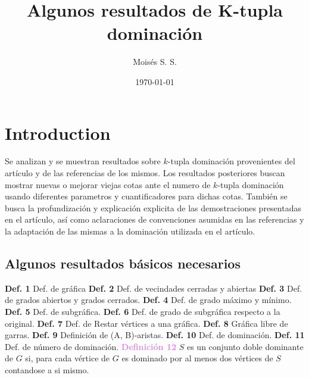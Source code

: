 \documentclass{article}
\title{Algunos resultados de K-tupla dominación}
\author{Moisés S. S.}
\date{\today}
\begin{document}
	\maketitle
	\section*{Introduction}

Se analizan y se muestran resultados sobre $k$-tupla dominación provenientes del artículo \cite{cabrera2022some} y de las referencias de los mismos. Los resultados posteriores buscan mostrar nuevas o mejorar viejas cotas ante el numero de $k$-tupla dominación usando diferentes parametros y cuantificadores para dichas cotas. También se busca la profundización y explicación explicita de las  demostraciones presentadas en el artículo, así como aclaraciones de convenciones asumidas en las referencias y la adaptación de las mismas a la dominación utilizada en el artículo.

	\subsection{Algunos resultados básicos necesarios}

\textbf{Def. 1} Def. de gráfica \newline
\textbf{Def. 2} Def. de vecindades cerradas y abiertas\newline
\textbf{Def. 3} Def. de grados abiertos y grados cerrados.\newline
\textbf{Def. 4} Def. de grado máximo y mínimo.\newline
\textbf{Def. 5} Def. de subgráfica.\newline
\textbf{Def. 6} Def. de grado de subgráfica respecto a la original.\newline
\textbf{Def. 7} Def. de Restar vértices a una gráfica.\newline
\textbf{Def. 8} Gráfica libre de garras.\newline
\textbf{Def. 9} Definición de (A, B)-aristas.\newline
\textbf{Def. 10} Def. de dominación.\newline
\textbf{Def. 11} Def. de número de dominación.\newline
\textcolor{Violet}{\textbf{Definición 12}} $S$ es un conjunto doble dominante de $G$ si, para cada vértice de $G$ es dominado por al menos dos vértices de $S$ contandose a si mismo.\\
\end{document}
